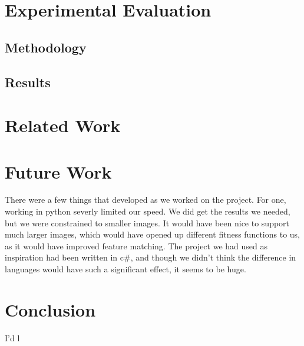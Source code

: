 \documentclass[12pt,letterpaper]{article}
\begin{document}
\section{Experimental Evaluation}

\subsection{Methodology}

\subsection{Results}

\section{Related Work}

\section{Future Work}
There were a few things that developed as we worked on the project. For one, working in python severly limited our speed. We did get the results we needed, but we were constrained to smaller images. It would have been nice to support much larger images, which would have opened up different fitness functions to us, as it would have improved feature matching. The project we had used as inspiration had been written in c\#, and though we didn't think the difference in languages would have such a significant effect, it seems to be huge.

\section{Conclusion}

I'd l
\end{document}
